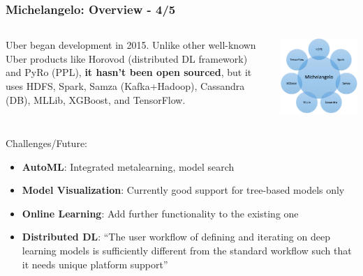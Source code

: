 \documentclass[hyperref={pdfpagelabels=false}]{beamer}
\begin{document}
        

        \begin{frame}
          \frametitle{Michelangelo: Overview - 4/5}
          
          \begin{columns}
            \begin{block}{} %
              \small{Uber began development in 2015. Unlike other well-known Uber products like Horovod (distributed DL framework) and PyRo (PPL), \textbf{it hasn't been open sourced}, but it uses HDFS, Spark, Samza (Kafka+Hadoop), Cassandra (DB), MLLib, XGBoost, and TensorFlow.} %
       \end{block}

         \centering
         \includegraphics[scale=0.28]{michelangelo_oss.png}
       \end{columns}


          Challenges/Future:
          \begin{itemize}
          \item \small{\textbf{AutoML}: Integrated metalearning, model search}
          \item \small{\textbf{Model Visualization}: Currently good support for tree-based models only}
          \item \small{\textbf{Online Learning}: Add further functionality to the existing one}
          \item \small{\textbf{Distributed DL}: ``The user workflow of defining and iterating on deep learning models is sufficiently different from the standard workflow such that it needs unique platform support''}
          \end{itemize}
      
        \end{frame}
\end{document}
